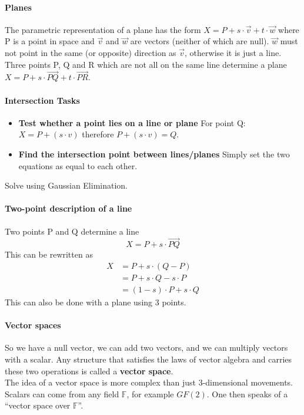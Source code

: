 \documentclass{article}
\begin{document}
\paragraph{Planes}
The parametric representation of a plane has the form $X=P+s\cdot \vec{v}+t\cdot \vec{w}$ where P is a point in space and $\vec{v}$ and $\vec{w}$ are vectors (neither of which are null). $\vec{w}$ must not point in the same (or opposite) direction as $\vec{v}$, otherwise it is just a line.
\vspace{1mm}\\
Three points P, Q and R which are not all on the same line determine a plane $X=P+s\cdot \vec{PQ}+t\cdot \vec{PR}$.

\paragraph{Intersection Tasks}
\begin{itemize}
\item \textbf{Test whether a point lies on a line or plane} For point Q: $X = P + (s \cdot v)$ therefore $P + (s \cdot v) = Q$.
\item \textbf{Find the intersection point between lines/planes} Simply set the two equations as equal to each other.
\end{itemize}
Solve using Gaussian Elimination.

\paragraph{Two-point description of a line} Two points P and Q determine a line
$$X = P + s\cdot \vec{PQ}$$
This can be rewritten as
\begin{align*}
X &= P+s\cdot (Q-P)\\
&= P + s\cdot Q-s\cdot P\\
&= (1-s)\cdot P+s\cdot Q
\end{align*}
This can also be done with a plane using 3 points.

\paragraph{Vector spaces}
So we have a null vector, we can add two vectors, and we can multiply vectors with a scalar.
Any structure that satisfies the laws of vector algebra and carries these two operations is called a \textbf{vector space}.
\vspace{1mm}\\
The idea of a vector space is more complex than just 3-dimensional movements. Scalars can come from any field $\mathbb{F}$, for example $GF(2)$. One then speaks of a ``vector space over $\mathbb{F}$''.
\end{document}
